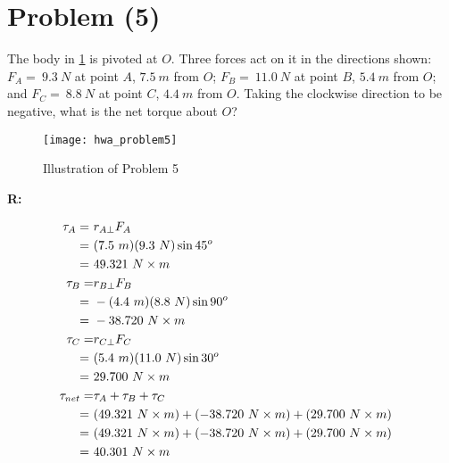 \section{Problem (5)}
	The body in \cref{fig:hwa_problem5} is pivoted at $O$. Three forces act on it in the directions shown: $F_{A} = \ 9.3 \ N$ at point $A$, $7.5 \ m$ from $O$; $F_{B} = \ 11.0 \ N$ at point $B$, $5.4 \ m$ from $O$; and $F_{C} = \ 8.8 \ N$ at point $C$, $4.4 \ m$ from $O$. Taking the clockwise direction to be negative, what is the net torque about $O$?

	\begin{figure}[H]
		\begin{center}
			\texttt{[image: hwa\_problem5]}
			\caption{Illustration of Problem 5}
			\label{fig:hwa_problem5}
		\end{center}
	\end{figure}

	\textbf{R:}

	\begin{align}
		\tau_{A} = \ &r_{A\perp}F_{A}& \notag \\
		= \ &(7.5 \ m)(9.3 \ N) \sin 45^{o}& \notag \\
		= \ &49.321 \ N \times m& \notag \\
		\tau_{B} = &r_{B\perp}F_{B}& \notag \\
		= \ &-(4.4 \ m)(8.8 \ N) \sin 90^{o}& \notag \\
		= \ &-38.720 \ N \times m& \notag \\
		\tau_{C} = &r_{C\perp}F_{C}& \notag \\
		= \ &(5.4 \ m)(11.0 \ N) \sin 30^{o}& \notag \\
		= \ &29.700 \ N \times m& \notag \\
		\tau_{net} = &\tau_{A} + \tau_{B} + \tau_{C}& \notag \\
		= \ &(49.321 \ N \times m) + (-38.720 \ N \times m) + (29.700 \ N \times m)& \notag \\
		= \ &(49.321 \ N \times m) + (-38.720 \ N \times m) + (29.700 \ N \times m)& \notag \\
		= \ &40.301 \ N \times m&
	\end{align}
